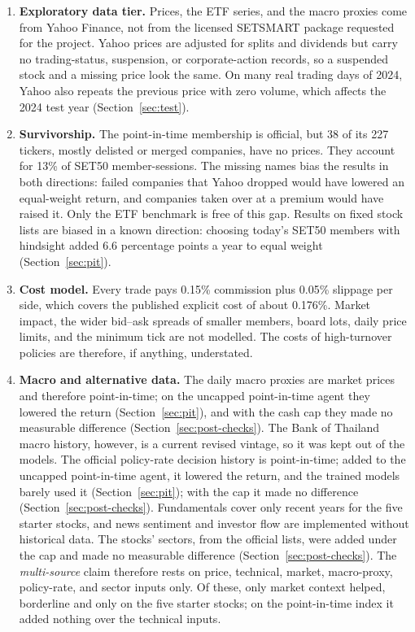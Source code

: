 \begin{enumerate}
  \item \textbf{Exploratory data tier.} Prices, the ETF series, and the macro proxies come from Yahoo Finance, not from the licensed SETSMART package requested for the project. Yahoo prices are adjusted for splits and dividends but carry no trading-status, suspension, or corporate-action records, so a suspended stock and a missing price look the same. On many real trading days of 2024, Yahoo also repeats the previous price with zero volume, which affects the 2024 test year (Section~\ref{sec:test}).
  \item \textbf{Survivorship.} The point-in-time membership is official, but 38 of its 227 tickers, mostly delisted or merged companies, have no prices. They account for 13\% of SET50 member-sessions. The missing names bias the results in both directions: failed companies that Yahoo dropped would have lowered an equal-weight return, and companies taken over at a premium would have raised it. Only the ETF benchmark is free of this gap. Results on fixed stock lists are biased in a known direction: choosing today's SET50 members with hindsight added 6.6 percentage points a year to equal weight (Section~\ref{sec:pit}).
  \item \textbf{Cost model.} Every trade pays 0.15\% commission plus 0.05\% slippage per side, which covers the published explicit cost of about 0.176\%. Market impact, the wider bid--ask spreads of smaller members, board lots, daily price limits, and the minimum tick are not modelled. The costs of high-turnover policies are therefore, if anything, understated.
  \item \textbf{Macro and alternative data.} The daily macro proxies are market prices and therefore point-in-time; on the uncapped point-in-time agent they lowered the return (Section~\ref{sec:pit}), and with the cash cap they made no measurable difference (Section~\ref{sec:post-checks}). The Bank of Thailand macro history, however, is a current revised vintage, so it was kept out of the models. The official policy-rate decision history is point-in-time; added to the uncapped point-in-time agent, it lowered the return, and the trained models barely used it (Section~\ref{sec:pit}); with the cap it made no difference (Section~\ref{sec:post-checks}). Fundamentals cover only recent years for the five starter stocks, and news sentiment and investor flow are implemented without historical data. The stocks' sectors, from the official lists, were added under the cap and made no measurable difference (Section~\ref{sec:post-checks}). The \emph{multi-source} claim therefore rests on price, technical, market, macro-proxy, policy-rate, and sector inputs only. Of these, only market context helped, borderline and only on the five starter stocks; on the point-in-time index it added nothing over the technical inputs.

\end{enumerate}
